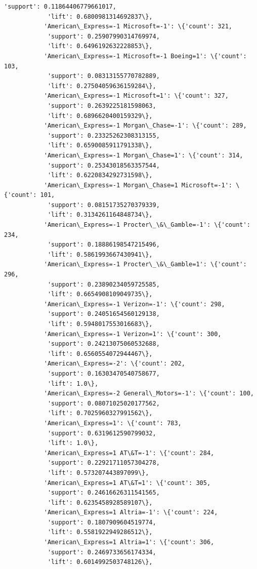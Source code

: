 \documentclass[11pt]{article}
\begin{document}
\begin{Verbatim}[commandchars=\\\{\}]
            'support': 0.11864406779661017,
            'lift': 0.6800981314692837\},
           'American\_Express=-1 Microsoft=-1': \{'count': 321,
            'support': 0.25907990314769974,
            'lift': 0.6496192632228853\},
           'American\_Express=-1 Microsoft=-1 Boeing=1': \{'count': 103,
            'support': 0.08313155770782889,
            'lift': 0.27504059636159284\},
           'American\_Express=-1 Microsoft=1': \{'count': 327,
            'support': 0.2639225181598063,
            'lift': 0.6896620400159329\},
           'American\_Express=-1 Morgan\_Chase=-1': \{'count': 289,
            'support': 0.23325262308313155,
            'lift': 0.6590085911791338\},
           'American\_Express=-1 Morgan\_Chase=1': \{'count': 314,
            'support': 0.25343018563357544,
            'lift': 0.6220834292731598\},
           'American\_Express=-1 Morgan\_Chase=1 Microsoft=-1': \{'count': 101,
            'support': 0.08151735270379339,
            'lift': 0.3134261164848734\},
           'American\_Express=-1 Procter\_\&\_Gamble=-1': \{'count': 234,
            'support': 0.18886198547215496,
            'lift': 0.5861993667430941\},
           'American\_Express=-1 Procter\_\&\_Gamble=1': \{'count': 296,
            'support': 0.23890234059725585,
            'lift': 0.6654908109049735\},
           'American\_Express=-1 Verizon=-1': \{'count': 298,
            'support': 0.24051654560129138,
            'lift': 0.5948017553016683\},
           'American\_Express=-1 Verizon=1': \{'count': 300,
            'support': 0.24213075060532688,
            'lift': 0.6560554072944467\},
           'American\_Express=-2': \{'count': 202,
            'support': 0.16303470540758677,
            'lift': 1.0\},
           'American\_Express=-2 General\_Motors=-1': \{'count': 100,
            'support': 0.08071025020177562,
            'lift': 0.7025960327991562\},
           'American\_Express=1': \{'count': 783,
            'support': 0.6319612590799032,
            'lift': 1.0\},
           'American\_Express=1 AT\&T=-1': \{'count': 284,
            'support': 0.22921711057304278,
            'lift': 0.573207443897099\},
           'American\_Express=1 AT\&T=1': \{'count': 305,
            'support': 0.24616626311541565,
            'lift': 0.6235458928589107\},
           'American\_Express=1 Altria=-1': \{'count': 224,
            'support': 0.1807909604519774,
            'lift': 0.5581922949286512\},
           'American\_Express=1 Altria=1': \{'count': 306,
            'support': 0.2469733656174334,
            'lift': 0.6014992503748126\},

\end{Verbatim}
\end{document}
